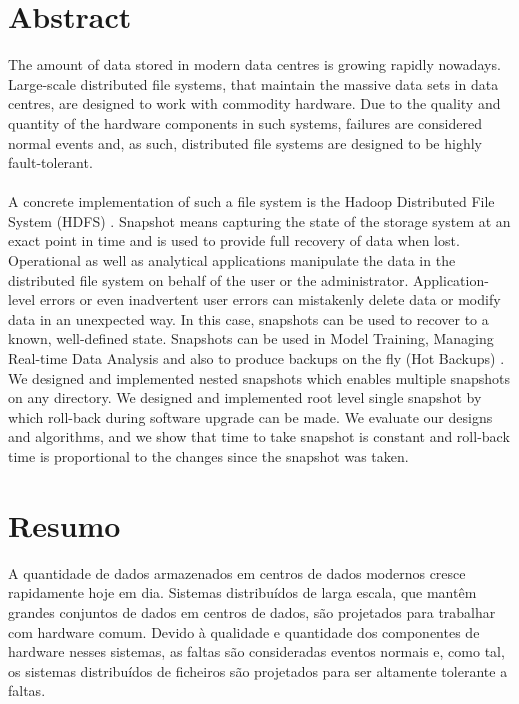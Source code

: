 \chapter*{Abstract}
\thispagestyle{empty}
The amount of data stored in modern data centres is growing rapidly nowadays.
Large-scale distributed file systems, that maintain the massive data sets in data
centres, are designed to work with commodity hardware. Due to the quality and
quantity of the hardware components in such systems, failures are considered
normal events and, as such, distributed file systems are designed to be highly
fault-tolerant. \\\\
\hspace{4em}     A concrete implementation of such a file system is the Hadoop Distributed File
System  (HDFS) . Snapshot means capturing the state of the storage system at an exact point in time and is used to provide full recovery of data when lost. Operational as well as analytical applications manipulate the data in the distributed file system on behalf of the user or the administrator. Application-level errors or even inadvertent user errors can mistakenly delete data or modify data in an unexpected way. In this case, snapshots can be used to recover to a known, well-defined state. Snapshots can be used in Model Training, Managing Real-time Data Analysis and also to produce backups on the fly (Hot Backups) . We designed and implemented nested snapshots which enables multiple snapshots on any directory. We designed and implemented root level single snapshot by which roll-back during software upgrade can be made. We evaluate our designs and algorithms, and we show that time to take snapshot is constant and roll-back time is proportional to the changes since the snapshot was taken.

\chapter*{Resumo}
\thispagestyle{empty}
A quantidade de dados armazenados em centros de dados modernos cresce rapidamente hoje em dia. Sistemas distribuídos de larga escala, que mantêm grandes conjuntos de dados em centros de dados, são projetados para  trabalhar com hardware comum. Devido à qualidade e quantidade dos componentes de hardware nesses sistemas, as faltas são consideradas eventos normais e, como tal, os sistemas distribuídos de ficheiros são projetados para ser altamente tolerante a faltas.

